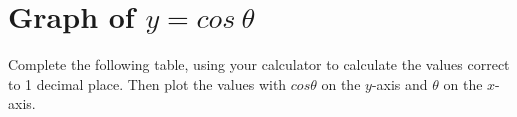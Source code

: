 \section{  Graph of $y=cos~\theta $}
\nopagebreak
\label{m39414*uid8032} Complete the following table, using your calculator to calculate the values correct to 1 decimal place. Then plot the values with $cos\theta $ on the $y$-axis and $\theta $ on the $x$-axis.\par 
\setlength\mytablespace{16\tabcolsep}
\addtolength\mytablespace{9\arrayrulewidth}
\setlength\mytablewidth{\linewidth}
\setlength\mytableroom{\mytablewidth}
\addtolength\mytableroom{-\mytablespace}
\setlength\myfixedwidth{0pt}
\setlength\mystarwidth{\mytableroom}
\addtolength\mystarwidth{-\myfixedwidth}
\divide{}
